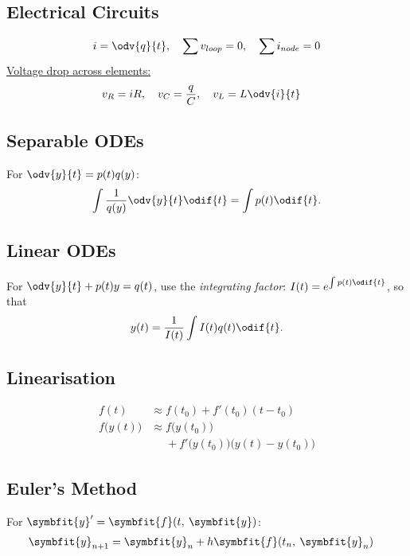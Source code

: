\documentclass{article}
\begin{document}
\begin{multicols}{3}
    \subsection*{Electrical Circuits}
    \begin{align*}
        i = \odv{q}{t},\quad \sum v_{loop} = 0,\quad \sum i_{node} = 0
    \end{align*}
    \underline{Voltage drop across elements:}
    \begin{align*}
        v_R = iR,\quad v_C = \frac{q}{C},\quad v_L & = L \odv{i}{t}
    \end{align*}
    \subsection*{Separable ODEs}
    For \(\odv{y}{t} = p(t) q(y)\):
    \begin{equation*}
        \int \frac{1}{q(y)} \odv{y}{t} \odif{t} = \int p(t) \odif{t}.
    \end{equation*}
    \subsection*{Linear ODEs}
    For \(\odv{y}{t} + p(t)y = q(t)\), use the \textit{integrating factor}:
    \(I(t) = e^{\int p(t) \odif{t}}\), so that
    \begin{equation*}
        y(t) = \frac{1}{I(t)} \int I(t) q(t) \odif{t}.
    \end{equation*}
    \subsection*{Linearisation}
    \begin{align*}
        f(t)              & \approx f(t_0) + f'(t_0)(t-t_0)                                 \\
        f\bigl(y(t)\bigr) & \approx f\bigl(y(t_0)\bigr)                                     \\
                          & \phantom{\approx} + f'\bigl(y(t_0)\bigr)\bigl(y(t)-y(t_0)\bigr)
    \end{align*}
    \subsection*{Euler's Method}
    For \(\symbfit{y}' = \symbfit{f}(t,\: \symbfit{y})\):
    \begin{align*}
        \symbfit{y}_{n+1} & = \symbfit{y}_{n} + h\symbfit{f}(t_n,\: \symbfit{y}_n)
    \end{align*}

\end{multicols}
\end{document}
